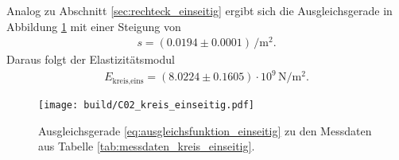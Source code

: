 \noindent
Analog zu Abschnitt \ref{sec:rechteck_einseitig} ergibt sich die Ausgleichsgerade in Abbildung \ref{fig:plot_kreis_einseitig}
mit einer Steigung von 
\begin{align*}
    s = (\num{0.0194} \pm \num{0.0001}) \, \unit{\per\meter^2}.
\end{align*}
Daraus folgt der Elastizitätsmodul
\begin{align}
    E_\text{kreis,eins} = (\num{8.0224} \pm \num{0.1605}) \cdot 10^9 \, \unit{\newton\per\meter^2}.
\end{align}

\begin{figure}[H]
    \centering
    \texttt{[image: build/C02\_kreis\_einseitig.pdf]}
    \caption{Ausgleichsgerade \eqref{eq:ausgleichsfunktion_einseitig} zu den Messdaten aus Tabelle \ref{tab:messdaten_kreis_einseitig}.}
    \label{fig:plot_kreis_einseitig}
\end{figure}